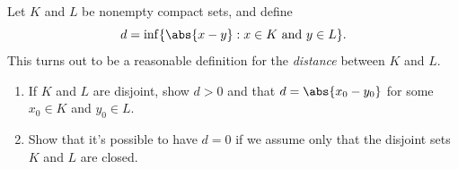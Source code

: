 \documentclass{lew98_solutions}
\begin{document}
\begin{exercise}
\label{ex:3.3.8}
    Let \( K \) and \( L \) be nonempty compact sets, and define
    \[
        d = \inf \{ \abs{x - y} : x \in K \text{ and } y \in L \}.
    \]
    This turns out to be a reasonable definition for the \textit{distance} between \( K \) and \( L \).
    \begin{enumerate}
        \item If \( K \) and \( L \) are disjoint, show \( d > 0 \) and that \( d = \abs{x_0 - y_0} \) for some \( x_0 \in K \) and \( y_0 \in L \).

        \item Show that it's possible to have \( d = 0 \) if we assume only that the disjoint sets \( K \) and \( L \) are closed.
    \end{enumerate}
\end{exercise}
\end{document}
